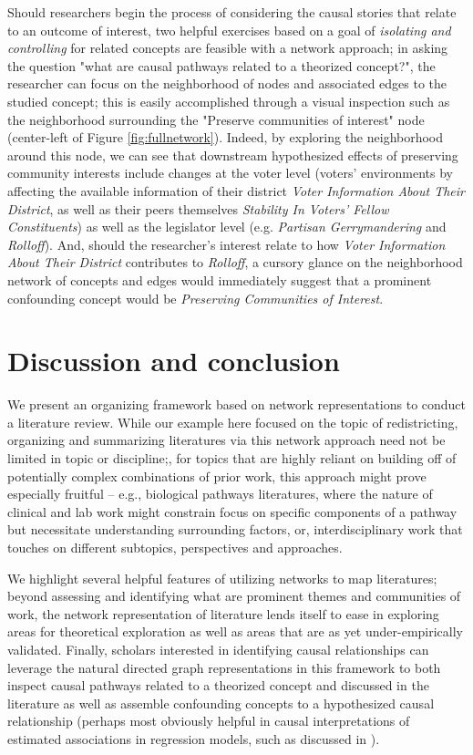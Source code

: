 \documentclass{cup-pan}
\begin{document}
Should researchers begin the process of considering the causal stories that relate to an outcome of interest, two helpful exercises based on a goal of \textit{isolating and controlling} for related concepts are feasible with a network approach; in asking the question "what are causal pathways related to a theorized concept?", the researcher can focus on the neighborhood of nodes and associated edges to the studied concept; this is easily accomplished through a visual inspection such as the neighborhood surrounding the "Preserve communities of interest" node (center-left of Figure \ref{fig:fullnetwork}). Indeed, by exploring the neighborhood around this node, we can see that downstream hypothesized effects of preserving community interests include changes at the voter level (voters' environments by affecting the available information of their district \textit{Voter Information About Their District}, as well as their peers themselves \textit{Stability In Voters' Fellow Constituents}) as well as the legislator level (e.g. \textit{Partisan Gerrymandering} and \textit{Rolloff}). And, should the researcher's interest relate to how \textit{Voter Information About Their District} contributes to \textit{Rolloff}, a cursory glance on the neighborhood network of concepts and edges would immediately suggest that a prominent confounding concept would be \textit{Preserving Communities of Interest}.




\section*{Discussion and conclusion}

We present an organizing framework based on network representations to conduct a literature review. While our example here focused on the topic of redistricting, organizing and summarizing literatures via this network approach need not be limited in topic or discipline;, for topics that are highly reliant on building off of potentially complex combinations of prior work, this approach might prove especially fruitful -- e.g., biological pathways literatures, where the nature of clinical and lab work might constrain focus on specific components of a pathway but necessitate understanding surrounding factors, or, interdisciplinary work that touches on different subtopics, perspectives and approaches.

We highlight several helpful features of utilizing networks to map literatures; beyond assessing and identifying what are prominent themes and communities of work, the network representation of literature lends itself to ease in exploring areas for theoretical exploration as well as areas that are as yet under-empirically validated. Finally, scholars interested in identifying causal relationships can leverage the natural directed graph representations in this framework to both inspect causal pathways related to a theorized concept and discussed in the literature as well as assemble confounding concepts to a hypothesized causal relationship (perhaps most obviously helpful in causal interpretations of estimated associations in regression models, such as discussed in \citet{keele_causal_2020}).
\end{document}
